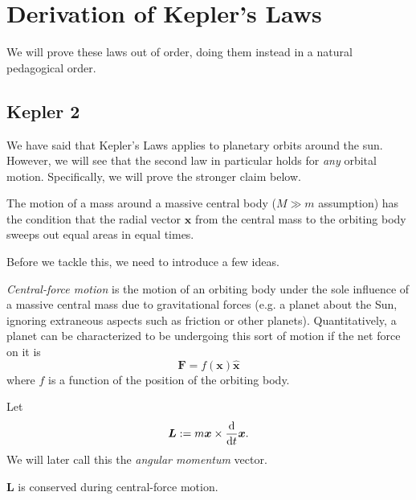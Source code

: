 \section{Derivation of Kepler's Laws}\label{section-derivation}
We will prove these laws out of order, doing them instead in a natural pedagogical order. 


\subsection{Kepler 2}\label{subsection-K2}
We have said that Kepler's Laws applies to planetary orbits around the sun. However, we will see that the second law in particular holds for \textit{any} orbital motion. Specifically, we will prove the stronger claim below. 
\begin{theorem}\label{K2}
The motion of a mass around a massive central body ($M \gg m$ assumption) has the condition that the radial vector $\bm x$ from the central mass to the orbiting body sweeps out equal areas in equal times. 
\end{theorem}
Before we tackle this, we need to introduce a few ideas.
\begin{defn}
\textit{Central-force motion} is the motion of an orbiting body under the sole influence of a massive central mass due to gravitational forces (e.g. a planet about the Sun, ignoring extraneous aspects such as friction or other planets). Quantitatively, a planet can be characterized to be undergoing this sort of motion if the net force on it is \begin{equation}
    \bm {F} = f(\bm{x})\bm{\hat{x}}
\end{equation}
where $f$ is a function of the position of the orbiting body. 
\end{defn}
\begin{defn}\label{angmom}
Let \begin{equation}
    \bm L := m \bm{x} \times \frac{\mathrm{d}}{\mathrm{d}t}{\bm x}.
\end{equation} We will later call this the \textit{angular momentum} vector. 
\end{defn}
\begin{lemma}
$\bm L$ is conserved during central-force motion. 
\end{lemma}

